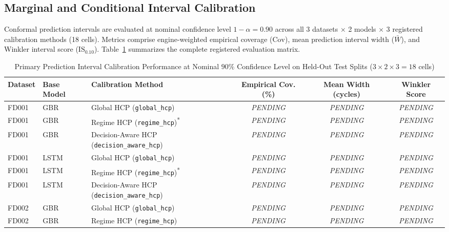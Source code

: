 \subsection{Marginal and Conditional Interval Calibration}
\label{subsec:calibration_results}
Conformal prediction intervals are evaluated at nominal confidence level $1-\alpha = 0.90$ across all 3 datasets $\times$ 2 models $\times$ 3 registered calibration methods (18 cells). Metrics comprise engine-weighted empirical coverage ($\text{Cov}$), mean prediction interval width ($\bar{W}$), and Winkler interval score ($\text{IS}_{0.10}$). Table~\ref{tab:calibration_performance} summarizes the complete registered evaluation matrix.

\begin{table}[htbp]
\centering
\caption{Primary Prediction Interval Calibration Performance at Nominal $90\%$ Confidence Level on Held-Out Test Splits ($3 \times 2 \times 3 = 18$ cells)}
\label{tab:calibration_performance}
\begin{tabular}{lllccc}
\toprule
\textbf{Dataset} & \textbf{Base Model} & \textbf{Calibration Method} & \textbf{Empirical Cov. (\%)} & \textbf{Mean Width (cycles)} & \textbf{Winkler Score} \\
\midrule
FD001 & GBR  & Global HCP (\texttt{global\_hcp})             & \textit{PENDING} & \textit{PENDING} & \textit{PENDING} \\
FD001 & GBR  & Regime HCP (\texttt{regime\_hcp})\textsuperscript{*} & \textit{PENDING} & \textit{PENDING} & \textit{PENDING} \\
FD001 & GBR  & Decision-Aware HCP (\texttt{decision\_aware\_hcp}) & \textit{PENDING} & \textit{PENDING} & \textit{PENDING} \\
\midrule
FD001 & LSTM & Global HCP (\texttt{global\_hcp})             & \textit{PENDING} & \textit{PENDING} & \textit{PENDING} \\
FD001 & LSTM & Regime HCP (\texttt{regime\_hcp})\textsuperscript{*} & \textit{PENDING} & \textit{PENDING} & \textit{PENDING} \\
FD001 & LSTM & Decision-Aware HCP (\texttt{decision\_aware\_hcp}) & \textit{PENDING} & \textit{PENDING} & \textit{PENDING} \\
\midrule
FD002 & GBR  & Global HCP (\texttt{global\_hcp})             & \textit{PENDING} & \textit{PENDING} & \textit{PENDING} \\
FD002 & GBR  & Regime HCP (\texttt{regime\_hcp})             & \textit{PENDING} & \textit{PENDING} & \textit{PENDING} \\

\end{tabular}
\end{table}
